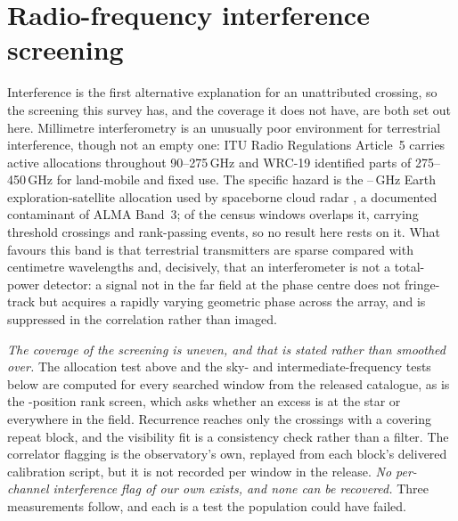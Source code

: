 \section{Radio-frequency interference screening}
\label{app:rfi}

Interference is the first alternative explanation for an unattributed
crossing, so the screening this survey has, and the coverage it does not
have, are both set out here. Millimetre interferometry is an unusually poor
environment for terrestrial interference, though not an empty one: ITU Radio
Regulations Article~5 \citep{ITU2024} carries active allocations throughout
90--275\,GHz and WRC-19 identified parts of 275--450\,GHz for land-mobile and
fixed use. The specific hazard is the \RadarLo--\RadarHi\,GHz Earth
exploration-satellite allocation used by spaceborne cloud radar
\citep{CloudSat2002,EarthCARE2023}, a documented contaminant of ALMA Band~3;
\RadarNWin{} of the \RadarNTot{} census windows overlaps it, carrying
\RadarNCross{} threshold crossings and \RadarNStage{} rank-passing events, so
no result here rests on it. What favours this band is that terrestrial
transmitters are sparse compared with centimetre wavelengths and, decisively,
that an interferometer is not a total-power detector: a signal not in the far
field at the phase centre does not fringe-track but acquires a rapidly
varying geometric phase across the array, and is suppressed in the
correlation rather than imaged.

\emph{The coverage of the screening is uneven, and that is stated rather than
smoothed over.} The allocation test above and the sky- and
intermediate-frequency tests below are computed for every searched window
from the released catalogue, as is the \NCtrl-position rank screen, which
asks whether an excess is at the star or everywhere in the field. Recurrence
reaches only the crossings with a covering repeat block, and the visibility
fit is a consistency check rather than a filter. The correlator flagging is
the observatory's own, replayed from each block's delivered calibration
script, but it is not recorded per window in the release. \emph{No
per-channel interference flag of our own exists, and none can be recovered.}
Three measurements follow, and each is a test the population could have
failed.

